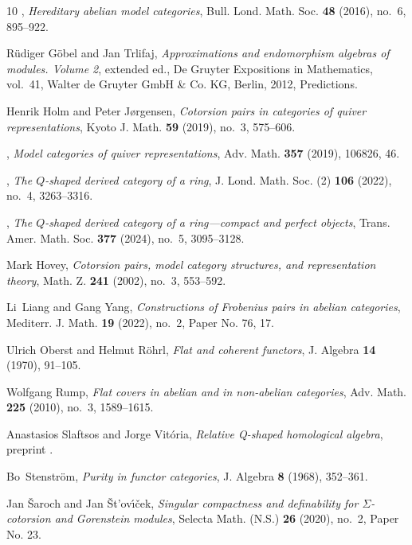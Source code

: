 \documentclass{amsart}
\theoremstyle{bfupright head,slanted body}
\theoremstyle{bfupright head,upright body}
\theoremstyle{fixed bf head,slanted body}
\theoremstyle{fixed bf head,upright body}
\theoremstyle{numbered paragraph}
\numberwithin{equation}{res}
\begin{document}
\begin{thebibliography}{10}
\bysame, \emph{Hereditary abelian model categories}, Bull. Lond. Math. Soc.
  \textbf{48} (2016), no.~6, 895--922. 

R\"{u}diger G\"{o}bel and Jan Trlifaj, \emph{Approximations and endomorphism
  algebras of modules. {V}olume 2}, extended ed., De Gruyter Expositions in
  Mathematics, vol.~41, Walter de Gruyter GmbH \& Co. KG, Berlin, 2012,
  Predictions. 

Henrik Holm and Peter J{\o}rgensen, \emph{Cotorsion pairs in categories of
  quiver representations}, Kyoto J. Math. \textbf{59} (2019), no.~3, 575--606.

\bysame, \emph{Model categories of quiver representations}, Adv. Math.
  \textbf{357} (2019), 106826, 46. 

\bysame, \emph{The {$Q$}-shaped derived category of a ring}, J. Lond. Math.
  Soc. (2) \textbf{106} (2022), no.~4, 3263--3316. 

\bysame, \emph{The {$Q$}-shaped derived category of a ring---compact and
  perfect objects}, Trans. Amer. Math. Soc. \textbf{377} (2024), no.~5,
  3095--3128. 

Mark Hovey, \emph{Cotorsion pairs, model category structures, and
  representation theory}, Math. Z. \textbf{241} (2002), no.~3, 553--592.

Li~Liang and Gang Yang, \emph{Constructions of {F}robenius pairs in abelian
  categories}, Mediterr. J. Math. \textbf{19} (2022), no.~2, Paper No. 76, 17.

Ulrich Oberst and Helmut R\"{o}hrl, \emph{Flat and coherent functors}, J.
  Algebra \textbf{14} (1970), 91--105. 

Wolfgang Rump, \emph{Flat covers in abelian and in non-abelian categories},
  Adv. Math. \textbf{225} (2010), no.~3, 1589--1615. 

Anastasios Slaftsos and Jorge Vit\'{o}ria, \emph{Relative {Q}-shaped
  homological algebra}, preprint \textbf{}.

Bo~Stenstr\"{o}m, \emph{Purity in functor categories}, J. Algebra \textbf{8}
  (1968), 352--361. 

Jan \v{S}aroch and Jan \v{S}t'ov\'{\i}\v{c}ek, \emph{Singular compactness and
  definability for {$\Sigma$}-cotorsion and {G}orenstein modules}, Selecta
  Math. (N.S.) \textbf{26} (2020), no.~2, Paper No. 23. 

\end{thebibliography}
\end{document}
